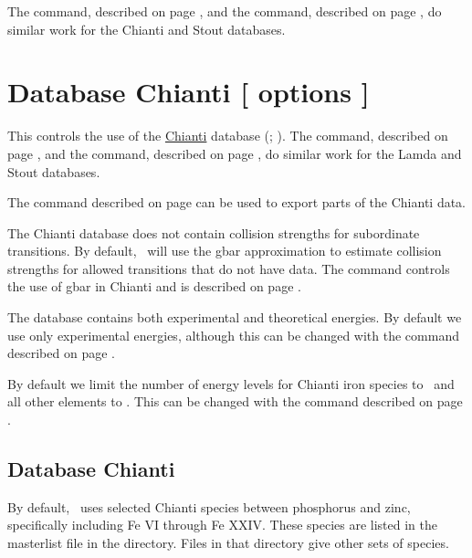 The  command, described on page \pageref{sec:SetChianti},
and the  command, described on page \pageref{sec:SetStout},
do similar work for the Chianti and Stout databases.

\section{Database Chianti [ options ]}
\label{sec:SetChianti}

This controls the use of the 
\href{http://www.chiantidatabase.org/}{Chianti} database 
(\cite{Dere.K97CHIANTI---an-atomic-database-for-emission}; \cite{Landi2012}).
The  command, described on page \pageref{sec:SetLamda},
and the  command, described on page \pageref{sec:SetStout},
do similar work for the Lamda and Stout databases.

The  command described on 
page \pageref{sec:CommandSaveChianti} can be used to export parts of 
the Chianti data.

The Chianti database does not contain collision strengths for subordinate transitions.
By default, \Cloudy\ will use the gbar approximation to estimate collision strengths for allowed transitions that do not have data. 
The  command controls the use of gbar in Chianti and is described on page \pageref{sec:Setgbar}.

The database contains both experimental and theoretical energies.  By default
we use only experimental energies, although this can be changed with the 
 command described on page \pageref{sec:AtomChiantiExperimental}.

By default we limit the number of energy levels for Chianti iron species to 
\nDefaultPhotoLevelsFe\ and all other elements to \nDefaultPhotoLevels.
This can be changed with the   command
described on page \pageref{sec:AtomChiantiLevels}.

\subsection{Database Chianti }
By default, \Cloudy\ uses selected Chianti species between phosphorus and zinc, 
specifically including Fe VI through Fe XXIV.
These species are listed in the  masterlist file in the 
 directory.
Files in that directory give other sets of species.

